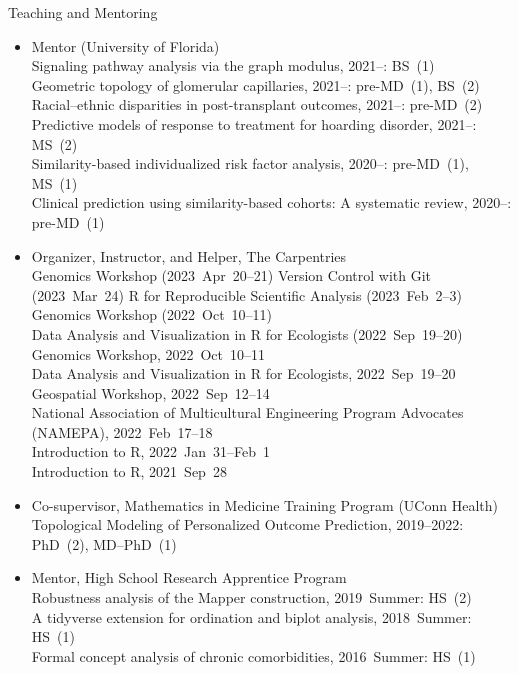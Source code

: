 \documentclass[10pt,a4paper]{article}
\begin{document}
\vspace{.25cm}
{\sc Teaching and Mentoring}
\begin{itemize}[label=$\circ$,nolistsep]
\item
Mentor (University of Florida) \\
Signaling pathway analysis via the graph modulus, 2021--: BS~(1) \\
Geometric topology of glomerular capillaries, 2021--: pre-MD~(1), BS~(2) \\
Racial--ethnic disparities in post-transplant outcomes, 2021--: pre-MD~(2) \\
Predictive models of response to treatment for hoarding disorder, 2021--: MS~(2) \\
Similarity-based individualized risk factor analysis, 2020--: pre-MD~(1), MS~(1) \\
Clinical prediction using similarity-based cohorts: A systematic review, 2020--: pre-MD~(1)
\item
Organizer, Instructor, and Helper, The Carpentries \\
Genomics Workshop (2023~Apr~20--21)
Version Control with Git (2023~Mar~24)
R for Reproducible Scientific Analysis (2023~Feb~2--3)
Genomics Workshop (2022~Oct~10--11) \\
Data Analysis and Visualization in R for Ecologists (2022~Sep~19--20) \\
Genomics Workshop, 2022~Oct~10--11 \\
Data Analysis and Visualization in R for Ecologists, 2022~Sep~19--20 \\
Geospatial Workshop, 2022~Sep~12--14 \\
National Association of Multicultural Engineering Program Advocates (NAMEPA), 2022~Feb~17--18 \\
Introduction to R, 2022~Jan~31--Feb~1 \\
Introduction to R, 2021~Sep~28
\item
Co-supervisor, Mathematics in Medicine Training Program (UConn Health) \\
Topological Modeling of Personalized Outcome Prediction, 2019--2022: PhD~(2), MD--PhD~(1)
\item
Mentor, High School Research Apprentice Program \\
Robustness analysis of the Mapper construction, 2019~Summer: HS~(2) \\
A tidyverse extension for ordination and biplot analysis, 2018~Summer: HS~(1) \\
Formal concept analysis of chronic comorbidities, 2016~Summer: HS~(1)

\end{itemize}
\end{document}
